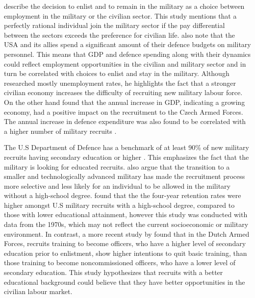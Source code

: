 \textcite{warner_chapter_1995} describe the decision to enlist and to remain in the military
as a choice between employment in the military or the civilian sector. This study 
mentions that a perfectly rational individual join the military sector if the pay
differential between the sectors exceeds the preference for civilian life. \textcite{warner_chapter_1995} 
also note that the USA and its allies spend a significant amount of 
their defence budgets on military personnel. This means that GDP and defence spending 
along with their dynamics could reflect employment opportunities in the civilian and 
military sector and in turn be correlated with choices to enlist and stay in the military.
Although \textcite{backstrom_are_2019} researched mostly unemployment rates, he highlights 
the fact that a stronger civilian economy increases the difficulty of recruiting new military 
labour force. On the other hand \textcite{holcner_military_2021} found that the annual 
increase in GDP, indicating a growing economy, had a positive impact on the recruitment to the 
Czech Armed Forces. The annual increase in defence expenditure was also found to be 
correlated with a higher number of military recruits \parencite{holcner_military_2021}.

The U.S Department of Defence has a benchmark of at least 90\% of new military recruits 
having secondary education or higher \parencite{cnas_resources_and_force_readiness_division_fiscal_nodate}.
This emphasizes the fact that the military is looking for educated recruits. \textcite{asoni_rich_2013} 
also argue that the transition to a smaller and technologically advanced military has 
made the recruitment process more selective and less likely for an individual to 
be allowed in the military without a high-school degree. \textcite{elster_study_1982} 
found that the the four-year retention rates were higher amongst U.S military recruits 
with a high-school degree, compared to those with lower educational attainment, however 
this study was conducted with data from the 1970s, which may not reflect the current 
socioeconomic or military environment. 
In contrast, a more recent study by \textcite{hof_quality_2023} found that in the 
Dutch Armed Forces, recruits training to become officers, who have a higher level of 
secondary education prior to enlistment, show higher intentions to quit basic training, 
than those training to become noncommissioned officers, who have a lower level of 
secondary education. This study hypothesizes that recruits with a better educational 
background could believe that they have better opportunities in the civilian labour market.

